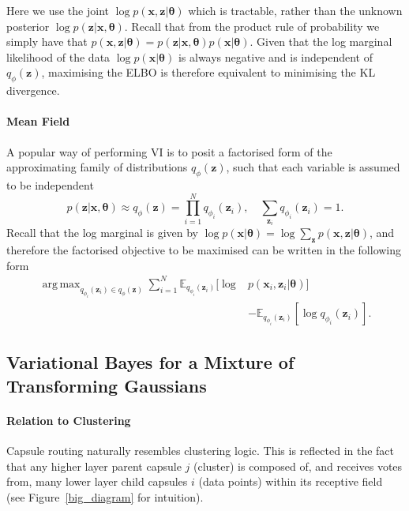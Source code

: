 \documentclass[letterpaper]{article} \usepackage{aaai20}  \usepackage{times}  \usepackage{helvet} \usepackage{courier}  \usepackage[hyphens]{url}  \usepackage{graphicx} \urlstyle{rm} \def\UrlFont{\rm}  \usepackage{graphicx}  \frenchspacing  \setlength{\pdfpagewidth}{8.5in}  \setlength{\pdfpageheight}{11in}  \nocopyright
\DeclareMathOperator*{\argmax}{arg\,max}
\begin{document}
Here we use the joint $\log p(\mathbf{x},\mathbf{z}|\boldsymbol{\theta})$ which is tractable, rather than the unknown posterior $\log p(\mathbf{z}|\mathbf{x},\boldsymbol{\theta})$. Recall that from the product rule of probability we simply have that $p(\mathbf{x},\mathbf{z}|\boldsymbol{\theta}) = p(\mathbf{z}|\mathbf{x},\boldsymbol{\theta})p(\mathbf{x}|\boldsymbol{\theta})$. Given that the log marginal likelihood of the data $\log p(\mathbf{x}|\boldsymbol{\theta})$ is always negative and is independent of $q_{\phi}(\mathbf{z})$, maximising the ELBO is therefore equivalent to minimising the KL divergence.
\paragraph{Mean Field}
A popular way of performing VI is to posit a factorised form of the approximating family of distributions $q_\phi(\mathbf{z})$, such that each variable is assumed to be independent
\begin{equation}
    p(\mathbf{z}|\mathbf{x},\boldsymbol{\theta}) \approx q_\phi(\mathbf{z}) = \prod_{i=1}^{N} q_{\phi_i}(\mathbf{z}_{i}), \quad \sum_{\mathbf{z}_{i}}q_{\phi_i}(\mathbf{z}_i) = 1.    
\end{equation}
Recall that the log marginal is given by $\log p(\mathbf{x}|\boldsymbol{\theta}) = \log \sum_\mathbf{z}p(\mathbf{x},\mathbf{z}|\boldsymbol{\theta})$, and therefore the factorised objective to be maximised can be written in the following form
\begin{equation}
\begin{aligned}
    \argmax_{q_{\phi_i}(\mathbf{z}_i) \in q_\phi(\mathbf{z})} \sum_{i=1}^{N} 
     \mathbb{E}_{q_{\phi_i}(\mathbf{z}_i)} [\log& p(\mathbf{x}_i,\mathbf{z}_i|\boldsymbol{\theta})] \\ &- \mathbb{E}_{q_{\phi_i}(\mathbf{z}_i)} [\log q_{\phi_i}(\mathbf{z}_i)].
\end{aligned}
\end{equation}
\subsection{Variational Bayes for a Mixture of Transforming Gaussians}\label{subsec: Variational Bayes for a Mixture of Transforming Gaussians}
\paragraph{Relation to Clustering} Capsule routing naturally resembles clustering logic. This is reflected in the fact that any higher layer parent capsule $j$ (cluster) is composed of, and receives votes from, many lower layer child capsules $i$ (data points) within its receptive field (see Figure~\ref{big_diagram} for intuition). 
\end{document}
